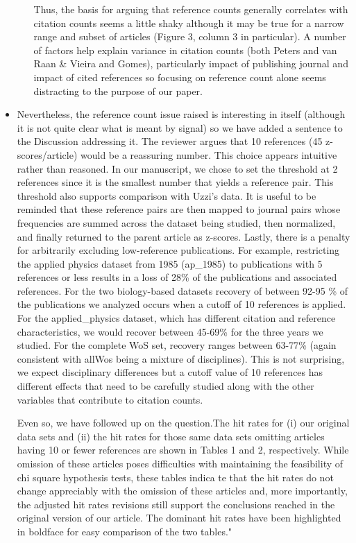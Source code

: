 \documentclass[11pt, oneside]{article}   	%
\begin{document}
\begin{itemize}
\begin{enumerate}
Thus, the basis for arguing that reference counts generally correlates with citation counts seems a little shaky although it may be true for a narrow range and subset of articles (Figure 3, column 3 in particular). A number of factors help explain variance in citation counts (both Peters and van Raan \& Vieira and Gomes), particularly impact of publishing journal and impact of cited references so focusing on reference count alone seems distracting to the purpose of our paper. 
\end{enumerate}
\item Nevertheless, the reference count issue raised is interesting in itself (although it is not quite clear what is meant by signal) so we have added a sentence to the Discussion addressing it. The reviewer argues that 10 references (45 z-scores/article) would be a reassuring number. This choice appears intuitive rather than reasoned. In our manuscript, we chose to set the threshold at 2 references since it is the smallest number that yields a reference pair. This threshold also supports comparison with Uzzi's data. It is useful to be reminded that these reference pairs are then mapped to journal pairs whose frequencies are summed across the dataset being studied, then normalized, and finally returned to the parent article as z-scores. Lastly, there is a penalty for arbitrarily excluding low-reference publications. For example, restricting the applied physics dataset from 1985 (ap\_1985) to publications with 5 references or less results in a loss of 28\% of the publications and associated references. For the two biology-based datasets recovery of between 92-95 \% of the publications we analyzed occurs when a cutoff of 10 references is applied. For the applied\_physics dataset, which has different citation and reference characteristics, we would recover between 45-69\% for the three years we studied. For the complete WoS set, recovery ranges between 63-77\% (again consistent with allWos being a mixture of disciplines). This is not surprising, we expect disciplinary differences but a cutoff value of 10 references has different effects that need to be carefully studied along with the other variables that contribute to citation counts.

\vspace{3mm} Even so, we have followed up on the question.The hit rates for (i) our original data sets and (ii) the hit rates for those same data sets omitting articles having 10 or fewer references are shown in Tables 1 and 2, respectively.  While omission of these articles poses difficulties with maintaining the feasibility of chi square hypothesis tests, these tables indica
te that the hit rates do not change appreciably with the omission of these articles and, more importantly, the adjusted hit rates revisions still support the conclusions reached in the original version of our article.  The dominant hit rates have been highlighted in boldface for easy comparison of the two tables."
\end{itemize}
\end{document}
